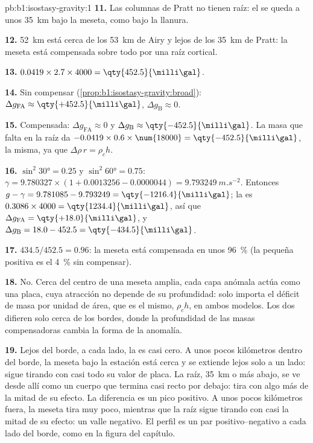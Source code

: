 \begin{solution}{pb:b1:isostasy-gravity:1}
\textbf{11.} Las columnas de Pratt no tienen raíz: el  se queda a unos \qty{35}{km} bajo la meseta, como bajo la llanura.

\textbf{12.} \qty{52}{km} está cerca de los \qty{53}{km} de Airy y lejos de los \qty{35}{km} de Pratt: la meseta está compensada sobre todo por una raíz cortical.

\textbf{13.} $0.0419\times2.7\times4000 = \qty{452.5}{\milli\gal}$.

\textbf{14.} Sin compensar (\cref{prop:b1:isostasy-gravity:broad}):
$\Delta g_{\mathrm{FA}} \approx \qty{+452.5}{\milli\gal}$,
$\Delta g_{\mathrm B} \approx 0$.

\textbf{15.} Compensada: $\Delta g_{\mathrm{FA}} \approx 0$ y
$\Delta g_{\mathrm B} \approx \qty{-452.5}{\milli\gal}$. La masa que falta en la raíz
da $-0.0419\times0.6\times\num{18000} = \qty{-452.5}{\milli\gal}$, la misma,
ya que $\Delta\rho\,r = \rho_c h$.

\textbf{16.} $\sin^2\ang{30} = 0.25$ y $\sin^2\ang{60} = 0.75$:
$\gamma = 9.780327\times(1 + 0.0013256 - 0.0000044) = \qty{9.793249}{m.s^{-2}}$.
Entonces $g - \gamma = 9.781085 - 9.793249 = \qty{-1216.4}{\milli\gal}$; la 
es $0.3086\times4000 = \qty{1234.4}{\milli\gal}$, así que
$\Delta g_{\mathrm{FA}} = \qty{+18.0}{\milli\gal}$, y
$\Delta g_{\mathrm B} = 18.0 - 452.5 = \qty{-434.5}{\milli\gal}$.

\textbf{17.} $434.5/452.5 = 0.96$: la meseta está compensada en unos \qty{96}{\percent}
(la pequeña  positiva es el \qty{4}{\percent} sin compensar).

\textbf{18.} No. Cerca del centro de una meseta amplia, cada capa anómala actúa
como una placa, cuya atracción no depende de su profundidad: solo importa el déficit de masa
por unidad de área, que es el mismo, $\rho_c h$, en ambos modelos. Los dos difieren
solo cerca de los bordes, donde la profundidad de las masas compensadoras cambia
la forma de la anomalía.

\textbf{19.} Lejos del borde, a cada lado, la  es casi cero.
A unos pocos kilómetros dentro del borde, la meseta bajo la estación está cerca y se extiende lejos solo a un lado: sigue tirando con casi todo su valor de placa.
La raíz, \qty{35}{km} o más abajo, se ve desde allí como un cuerpo que termina casi recto por debajo: tira con algo más de la mitad de su efecto. La diferencia es un pico positivo. A unos pocos kilómetros fuera, la meseta tira muy poco, mientras que la raíz sigue tirando con casi la mitad de su efecto: un valle negativo. El perfil es un par positivo--negativo a cada lado del borde, como en la figura del capítulo.


\end{solution}
